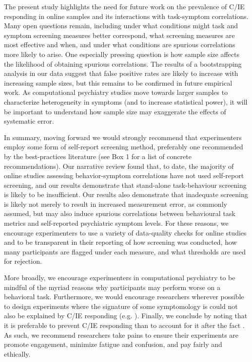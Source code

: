 \documentclass[a4paper,notitlepage,12pt]{article}
\begin{document}
The present study highlights the need for future work on the prevalence of C/IE responding in online samples and its interactions with task-symptom correlations. Many open questions remain, including under what conditions might task and symptom screening measures better correspond, what screening measures are most effective and when, and under what conditions are spurious correlations more likely to arise. One especially pressing question is how sample size affects the likelihood of obtaining spurious correlations. The results of a bootstrapping analysis in our data suggest that false positive rates are likely to increase with increasing sample sizes, but this remains to be confirmed in future empirical work. As computational psychiatry studies move towards larger samples to characterize heterogeneity in symptoms (and to increase statistical power), it will be important to understand how sample size may exaggerate the effects of systematic error. 

In summary, moving forward we would strongly recommend that experimenters employ some form of self-report screening method, preferably one recommended by the best-practices literature (see Box 1 for a list of concrete recommendations). Our narrative review found that, to date, the majority of online studies assessing behavior-symptom correlations have not used self-report screening, and our results demonstrate that stand-alone task-behaviour screening is likely to be insufficient. Our results also demonstrate that inadequate screening is likely not merely to result in increased measurement error, as commonly assumed, but may also induce spurious correlations between behavioural task metrics and self-reported psychiatric symptom levels. For these reasons, we encourage experimenters to use a variety of data-quality checks for online studies and to be transparent in their reporting of how screening was conducted, how many participants are flagged under each measure, and what thresholds are used for rejection.

More broadly, we encourage experimenters in computational psychiatry to be mindful of the myriad reasons why participants may perform worse on a behavioral task. Furthermore, we would encourage researchers wherever possible to design experiments where the signature of some symptomology is could not also be explained by C/IE responding (e.g. \cite{hunter2019excessive}). Finally, we conclude by noting that it is preferable to prevent C/IE responding than to account for it after the fact \cite{ward2018applying}. As such, we recommend researchers take pains to ensure their experiments are promote engagement, minimize fatigue and confusion, and pay fairly and ethically.
\end{document}
